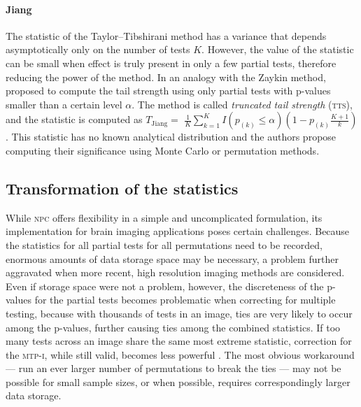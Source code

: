 \paragraph{Jiang} The statistic of the Taylor--Tibshirani method has a variance that depends asymptotically only on the number of tests $K$. However, the value of the statistic can be small when effect is truly present in only a few partial tests, therefore reducing the power of the method. In an analogy with the Zaykin method, \citet{Jiang2011} proposed to compute the tail strength using only partial tests with p-values smaller than a certain level $\alpha$. The method is called \emph{truncated tail strength} (\textsc{tts}), and the statistic is computed as $T_{\text{Jiang}} =$ $\frac{1}{K} \sum_{k=1}^{K} I\left(p_{(k)}\leqslant \alpha \right)\left(1-p_{(k)}\frac{K+1}{k}\right)$. This statistic has no known analytical distribution and the authors propose computing their significance using Monte Carlo or permutation methods.

\subsection{Transformation of the statistics}

While \textsc{npc} offers flexibility in a simple and uncomplicated formulation, its implementation for brain imaging applications poses certain challenges. Because the statistics for all partial tests for all permutations need to be recorded, enormous amounts of data storage space may be necessary, a problem further aggravated when more recent, high resolution imaging methods are considered. Even if storage space were not a problem, however, the discreteness of the p-values for the partial tests becomes problematic when correcting for multiple testing, because with thousands of tests in an image, ties are very likely to occur among the p-values, further causing ties among the combined statistics. If too many tests across an image share the same most extreme statistic, correction for the \textsc{mtp-i}, while still valid, becomes less powerful \citep{Westfall1993, Pantazis2005}. The most obvious workaround --- run an ever larger number of permutations to break the ties --- may not be possible for small sample sizes, or when possible, requires correspondingly larger data storage.

